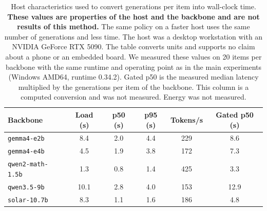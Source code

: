 \begin{table}[t]
\small\setlength{\tabcolsep}{3pt}
\caption{Host characteristics used to convert generations per item into wall-clock time. \textbf{These values are properties of the host and the backbone and are not results of this method.} The same policy on a faster host uses the same number of generations and less time. The host was a desktop workstation with an NVIDIA GeForce RTX 5090. The table converts units and supports no claim about a phone or an embedded board. We measured these values on 20 items per backbone with the same runtime and operating point as in the main experiments (Windows AMD64, runtime 0.34.2). Gated p50 is the measured median latency multiplied by the generations per item of the backbone. This column is a computed conversion and was not measured. Energy was not measured.\label{tab:device}}
\begin{tabularx}{\textwidth}{lCCCCC}
\toprule
\textbf{Backbone} & \textbf{Load (s)} & \textbf{p50 (s)} & \textbf{p95 (s)} & \textbf{Tokens/s} & \textbf{Gated p50 (s)} \\
\midrule
\texttt{gemma4-e2b} & 8.4 & 2.0 & 4.4 & 229 & 8.6 \\
\texttt{gemma4-e4b} & 4.5 & 1.9 & 3.8 & 172 & 7.3 \\
\texttt{qwen2-math-1.5b} & 1.3 & 0.8 & 1.4 & 425 & 3.3 \\
\texttt{qwen3.5-9b} & 10.1 & 2.8 & 4.0 & 153 & 12.9 \\
\texttt{solar-10.7b} & 8.3 & 1.1 & 1.6 & 186 & 4.8 \\
\bottomrule
\end{tabularx}
\end{table}

